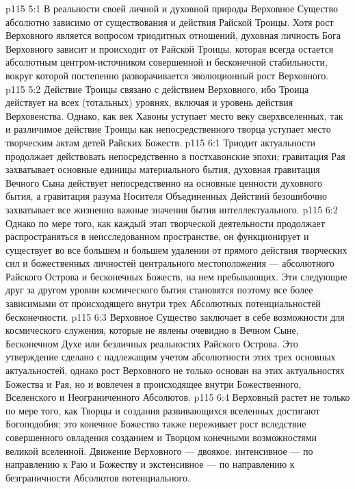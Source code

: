 \vs p115 5:1 В реальности своей личной и духовной природы Верховное Существо абсолютно зависимо от существования и действия Райской Троицы. Хотя рост Верховного является вопросом триодитных отношений, духовная личность Бога Верховного зависит и происходит от Райской Троицы, которая всегда остается абсолютным центром\hyp{}источником совершенной и бесконечной стабильности, вокруг которой постепенно разворачивается эволюционный рост Верховного.
\vs p115 5:2 Действие Троицы связано с действием Верховного, ибо Троица действует на всех (тотальных) уровнях, включая и уровень действия Верховенства. Однако, как век Хавоны уступает место веку сверхвселенных, так и различимое действие Троицы как непосредственного творца уступает место творческим актам детей Райских Божеств.
\vs p115 6:1 Триодит актуальности продолжает действовать непосредственно в постхавонские эпохи; гравитация Рая захватывает основные единицы материального бытия, духовная гравитация Вечного Сына действует непосредственно на основные ценности духовного бытия, а гравитация разума Носителя Объединенных Действий безошибочно захватывает все жизненно важные значения бытия интеллектуального.
\vs p115 6:2 Однако по мере того, как каждый этап творческой деятельности продолжает распространяться в неисследованном пространстве, он функционирует и существует во все большем и большем удалении от прямого действия творческих сил и божественных личностей центрального местоположения --- абсолютного Райского Острова и бесконечных Божеств, на нем пребывающих. Эти следующие друг за другом уровни космического бытия становятся поэтому все более зависимыми от происходящего внутри трех Абсолютных потенциальностей бесконечности.
\vs p115 6:3 Верховное Существо заключает в себе возможности для космического служения, которые не явлены очевидно в Вечном Сыне, Бесконечном Духе или безличных реальностях Райского Острова. Это утверждение сделано с надлежащим учетом абсолютности этих трех основных актуальностей, однако рост Верховного не только основан на этих актуальностях Божества и Рая, но и вовлечен в происходящее внутри Божественного, Вселенского и Неограниченного Абсолютов.
\vs p115 6:4 \pc Верховный растет не только по мере того, как Творцы и создания развивающихся вселенных достигают Богоподобия; это конечное Божество также переживает рост вследствие совершенного овладения созданием и Творцом конечными возможностями великой вселенной. Движение Верховного --- двоякое: интенсивное --- по направлению к Раю и Божеству и экстенсивное --- по направлению к безграничности Абсолютов потенциального.

